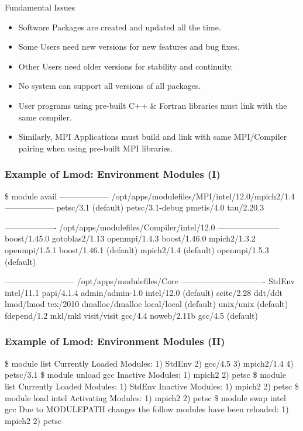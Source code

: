 \documentclass{beamer}
\begin{document}
\begin{frame}{Fundamental Issues}
  \begin{itemize}
    \item Software Packages are created and updated all the time.
    \item Some Users need new versions for new features and bug fixes.
    \item Other Users need older versions for stability and continuity.
    \item No system can support all versions of all packages.
    \item User programs using pre-built C++ \& Fortran libraries must link with the same compiler.
    \item Similarly, MPI Applications must build and link with same
      MPI/Compiler pairing when using pre-built MPI libraries.
  \end{itemize}
\end{frame}

\begin{frame}[fragile]
    \frametitle{Example of Lmod: Environment Modules (I)}
    {\tiny
\begin{semiverbatim}
\$ {\color{blue} module avail}
------------------ /opt/apps/modulefiles/MPI/intel/12.0/mpich2/1.4 ------------------
  petsc/3.1 (default)    petsc/3.1-debug    pmetis/4.0    tau/2.20.3

------------------- /opt/apps/modulefiles/Compiler/intel/12.0 -----------------------
  boost/1.45.0              gotoblas2/1.13          openmpi/1.4.3
  boost/1.46.0              mpich2/1.3.2            openmpi/1.5.1
  boost/1.46.1 (default)    mpich2/1.4 (default)    openmpi/1.5.3 (default)

-------------------------- /opt/apps/modulefiles/Core -------------------------------
  StdEnv               intel/11.1               papi/4.1.4
  admin/admin-1.0      intel/12.0 (default)     scite/2.28
  ddt/ddt              lmod/lmod                tex/2010
  dmalloc/dmalloc      local/local (default)    unix/unix (default)
  fdepend/1.2          mkl/mkl                  visit/visit
  gcc/4.4              noweb/2.11b
  gcc/4.5 (default)
\end{semiverbatim}
    }
\end{frame}

\begin{frame}[fragile]
    \frametitle{Example of Lmod: Environment Modules (II)}
    {\tiny
\begin{semiverbatim}
{\color{blue}\$ module list}
Currently Loaded Modules:
  1) StdEnv  2) gcc/4.5  3) mpich2/1.4  4) petsc/3.1
{\color{blue}\$ module unload gcc}
Inactive Modules:
  1) mpich2  2) petsc
{\color{blue}\$ module list}
Currently Loaded Modules:
  1) StdEnv
Inactive Modules:
  1) mpich2  2) petsc
{\color{blue}\$ module load intel}
Activating Modules:
  1) mpich2  2) petsc
{\color{blue}\$ module swap intel gcc}
Due to MODULEPATH changes the follow modules have been reloaded:
  1) mpich2  2) petsc
\end{semiverbatim}
    }
\end{frame}
\end{document}
